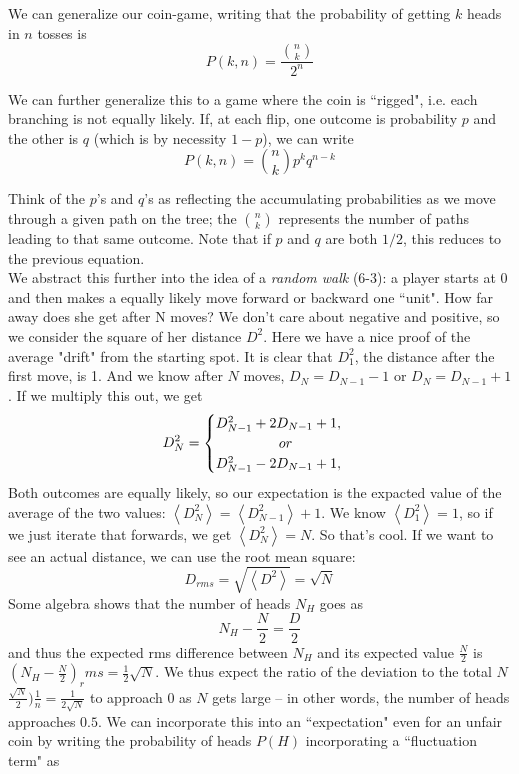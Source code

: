 \documentclass[10pt,letterpaper]{article}
\begin{document}
We can generalize our coin-game, writing that the probability of getting $k$ heads in $n$ tosses is 
$$ P(k, n) = \frac{{{n}\choose{k}}}{2^n}$$

We can further generalize this to a game where the coin is ``rigged", i.e. each branching is not equally likely. If, at each flip, one outcome is probability $p$ and the other is $q$ (which is by necessity $1-p$), we can write 
$$ P(k, n) =  {{n}\choose{k}}p^k q^{n-k}$$

Think of the $p$'s and $q$'s as reflecting the accumulating probabilities as we move through a given path on the tree; the ${{n}\choose{k}}$ represents the number of paths leading to that same outcome. Note that if $p$ and $q$ are both $1/2$, this reduces to the previous equation. \\

\indent We abstract this further into the idea of a \textit{random walk} (6-3): a player starts at 0 and then makes a equally likely move forward or backward one ``unit". How far away does she get after N moves? We don't care about negative and positive, so we consider the square of her distance $D^2$. Here we have a nice proof of the average "drift" from the starting spot. It is clear that $D_1^2$, the distance after the first move, is 1. And we know after $N$ moves, $D_N = D_{N-1} -1$ or $D_N = D_{N-1}+1$. If we multiply this out, we get 
\begin{equation}
    D_N^2=
    \begin{cases}
      D^2_{N-1} + 2D_{N-1} +1 , \\
     \indent \indent \indent or \\
      D^2_{N-1} - 2D_{N-1} + 1, 
    \end{cases}
  \end{equation}
Both outcomes are equally likely, so our expectation is the expacted value of the average of the two values: $\left<D^2_N\right> = \left<D^2_{N-1}\right> + 1$. We know $\left<D_1^2\right> = 1$, so if we just iterate that forwards, we get $\left<D^2_N\right> = N$. So that's cool. If we want to see an actual distance, we can use the root mean square: 
$$ D_{rms} = \sqrt{\left<D^2\right>} = \sqrt{N}
$$
Some algebra shows that the number of heads $N_H$ goes as
$$ N_H - \frac{N}{2} = \frac{D}{2}$$
and thus the expected rms difference between $N_H$ and its expected value $\frac{N}{2}$ is $\left(N_H - \frac{N}{2}\right)_rms = \frac{1}{2}\sqrt{N}$.
We thus expect the ratio of the deviation to the total $N$ $\frac{\sqrt{N}}{2})\frac{1}{n} = \frac{1}{2\sqrt{N}}$ to approach 0 as $N$ gets large -- in other words, the number of heads approaches $0.5$. We can incorporate this into an ``expectation" even for an unfair coin by writing the probability of heads $P(H)$ incorporating a ``fluctuation term" as
\end{document}
